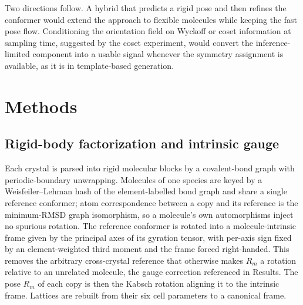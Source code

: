 \documentclass[10pt]{article}
\begin{document}
Two directions follow. A hybrid that predicts a rigid pose and then refines the
conformer would extend the approach to flexible molecules while keeping the
fast pose flow. Conditioning the orientation field on Wyckoff or coset
information at sampling time, suggested by the coset experiment, would convert
the inference-limited component into a usable signal whenever the symmetry
assignment is available, as it is in template-based generation.

\section{Methods}

\subsection{Rigid-body factorization and intrinsic gauge}
Each crystal is parsed into rigid molecular blocks by a covalent-bond graph with
periodic-boundary unwrapping. Molecules of one species are keyed by a
Weisfeiler--Lehman hash of the element-labelled bond graph and share a single
reference conformer; atom correspondence between a copy and its reference is the
minimum-RMSD graph isomorphism, so a molecule's own automorphisms inject no
spurious rotation. The reference conformer is rotated into a molecule-intrinsic
frame given by the principal axes of its gyration tensor, with per-axis sign
fixed by an element-weighted third moment and the frame forced right-handed.
This removes the arbitrary cross-crystal reference that otherwise makes $R_m$ a
rotation relative to an unrelated molecule, the gauge correction referenced in
Results. The pose $R_m$ of each copy is then the Kabsch rotation aligning it to
the intrinsic frame. Lattices are rebuilt from their six cell parameters to a
canonical frame.
\end{document}
